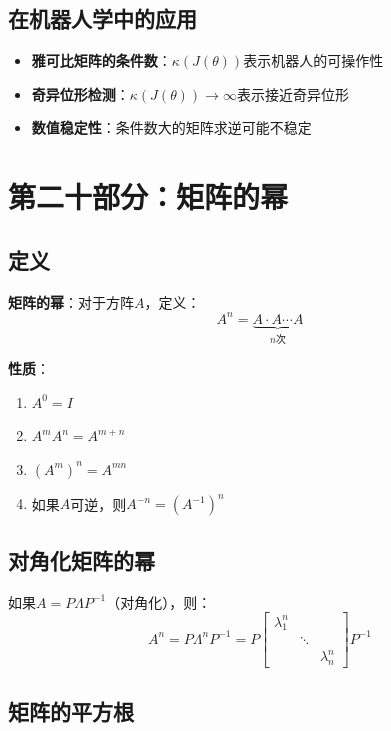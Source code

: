 \documentclass[12pt,a4paper]{article}
\begin{document}
\subsection{在机器人学中的应用}

\begin{itemize}
\item \textbf{雅可比矩阵的条件数}：$\kappa(J(\theta))$表示机器人的可操作性
\item \textbf{奇异位形检测}：$\kappa(J(\theta)) \to \infty$表示接近奇异位形
\item \textbf{数值稳定性}：条件数大的矩阵求逆可能不稳定
\end{itemize}

\section{第二十部分：矩阵的幂}

\subsection{定义}

\textbf{矩阵的幂}：对于方阵$A$，定义：
\begin{equation}
A^n = \underbrace{A \cdot A \cdots A}_{n \text{次}}
\end{equation}

\textbf{性质}：
\begin{enumerate}
\item $A^0 = I$
\item $A^m A^n = A^{m+n}$
\item $(A^m)^n = A^{mn}$
\item 如果$A$可逆，则$A^{-n} = (A^{-1})^n$
\end{enumerate}

\subsection{对角化矩阵的幂}

如果$A = P \Lambda P^{-1}$（对角化），则：
\begin{equation}
A^n = P \Lambda^n P^{-1} = P \begin{bmatrix} \lambda_1^n & & \\ & \ddots & \\ & & \lambda_n^n \end{bmatrix} P^{-1}
\end{equation}

\subsection{矩阵的平方根}
\end{document}
